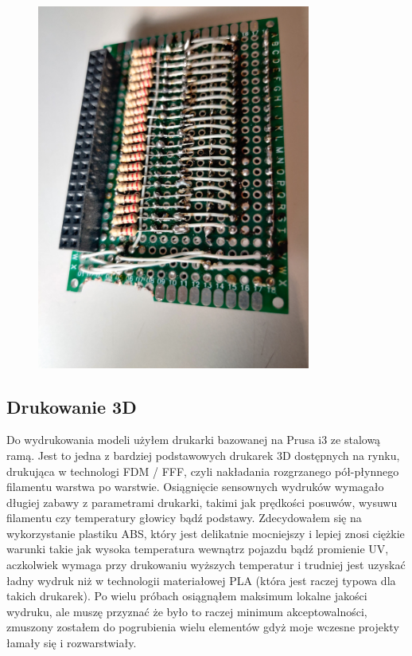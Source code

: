 \documentclass[declaration,shortabstract, inz]{iithesis}
\begin{document}
\begin{description}[style=nextline]
\begin{figure}[htp]
        \includegraphics[width=9cm, height=12cm]{images/voice_module_back.jpg}
        \label{fig:voice_module_back}
    \end{figure}
    \FloatBarrier
\end{description}





  
\subsection{Drukowanie 3D}
    Do wydrukowania modeli użyłem drukarki bazowanej na Prusa i3 ze stalową ramą. Jest to jedna z bardziej podstawowych drukarek 3D dostępnych na rynku, drukująca w technologi FDM / FFF, czyli nakładania rozgrzanego pół-płynnego filamentu warstwa po warstwie. Osiągnięcie sensownych wydruków wymagało długiej zabawy z parametrami drukarki, takimi jak prędkości posuwów, wysuwu filamentu czy temperatury głowicy bądź podstawy. Zdecydowałem się na wykorzystanie plastiku ABS, który jest delikatnie mocniejszy i lepiej znosi ciężkie warunki takie jak wysoka temperatura wewnątrz pojazdu bądź promienie UV, aczkolwiek wymaga przy drukowaniu wyższych temperatur i trudniej jest uzyskać ładny wydruk niż w technologii materiałowej PLA (która jest raczej typowa dla takich drukarek). Po wielu próbach osiągnąłem maksimum lokalne jakości wydruku, ale muszę przyznać że było to raczej minimum akceptowalności, zmuszony zostałem do pogrubienia wielu elementów gdyż moje wczesne projekty łamały się i rozwarstwiały.
    
\end{document}
